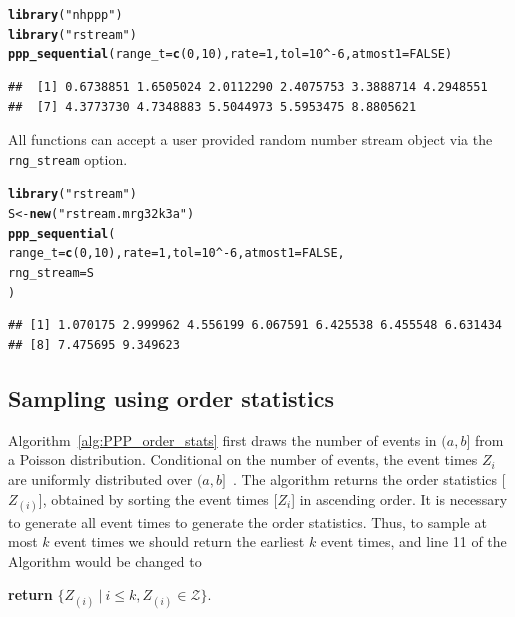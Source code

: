 \documentclass[article,nojss]{jss}\usepackage[]{graphicx}\usepackage[]{xcolor}
\makeatletter
\newcommand{\hlnum}[1]{\textcolor[rgb]{0.686,0.059,0.569}{#1}}%
\newcommand{\hlstr}[1]{\textcolor[rgb]{0.192,0.494,0.8}{#1}}%
\newcommand{\hlopt}[1]{\textcolor[rgb]{0,0,0}{#1}}%
\newcommand{\hlstd}[1]{\textcolor[rgb]{0.345,0.345,0.345}{#1}}%
\newcommand{\hlkwb}[1]{\textcolor[rgb]{0.69,0.353,0.396}{#1}}%
\newcommand{\hlkwc}[1]{\textcolor[rgb]{0.333,0.667,0.333}{#1}}%
\newcommand{\hlkwd}[1]{\textcolor[rgb]{0.737,0.353,0.396}{\textbf{#1}}}%
\newenvironment{kframe}{%
 \def\at@end@of@kframe{}%
 \ifinner\ifhmode%
  \def\at@end@of@kframe{\end{minipage}}%
  \begin{minipage}{\columnwidth}%
 \fi\fi%
 \def\FrameCommand##1{\hskip\@totalleftmargin \hskip-\fboxsep
 \colorbox{shadecolor}{##1}\hskip-\fboxsep
     \hskip-\linewidth \hskip-\@totalleftmargin \hskip\columnwidth}%
 \MakeFramed {\advance\hsize-\width
   \@totalleftmargin\z@ \linewidth\hsize
   \@setminipage}}%
 {\par\unskip\endMakeFramed%
 \at@end@of@kframe}
\newenvironment{knitrout}{}{} %
\makeatother
\begin{document}
\begin{knitrout}
\color{fgcolor}\begin{kframe}
\begin{alltt}
\hlkwd{library}\hlstd{(}\hlstr{"nhppp"}\hlstd{)}
\hlkwd{library}\hlstd{(}\hlstr{"rstream"}\hlstd{)}
\hlkwd{ppp_sequential}\hlstd{(}\hlkwc{range_t} \hlstd{=} \hlkwd{c}\hlstd{(}\hlnum{0}\hlstd{,} \hlnum{10}\hlstd{),} \hlkwc{rate} \hlstd{=} \hlnum{1}\hlstd{,} \hlkwc{tol} \hlstd{=} \hlnum{10}\hlopt{^-}\hlnum{6}\hlstd{,} \hlkwc{atmost1} \hlstd{=} \hlnum{FALSE}\hlstd{)}
\end{alltt}
\begin{verbatim}
##  [1] 0.6738851 1.6505024 2.0112290 2.4075753 3.3888714 4.2948551
##  [7] 4.3773730 4.7348883 5.5044973 5.5953475 8.8805621
\end{verbatim}
\end{kframe}
\end{knitrout}

All  functions can accept a user provided random number stream object via the \texttt{rng\_stream} option.

\begin{knitrout}
\color{fgcolor}\begin{kframe}
\begin{alltt}
\hlkwd{library}\hlstd{(}\hlstr{"rstream"}\hlstd{)}
\hlstd{S} \hlkwb{<-} \hlkwd{new}\hlstd{(}\hlstr{"rstream.mrg32k3a"}\hlstd{)}
\hlkwd{ppp_sequential}\hlstd{(}
  \hlkwc{range_t} \hlstd{=} \hlkwd{c}\hlstd{(}\hlnum{0}\hlstd{,} \hlnum{10}\hlstd{),} \hlkwc{rate} \hlstd{=} \hlnum{1}\hlstd{,} \hlkwc{tol} \hlstd{=} \hlnum{10}\hlopt{^-}\hlnum{6}\hlstd{,} \hlkwc{atmost1} \hlstd{=} \hlnum{FALSE}\hlstd{,}
  \hlkwc{rng_stream} \hlstd{= S}
\hlstd{)}
\end{alltt}
\begin{verbatim}
## [1] 1.070175 2.999962 4.556199 6.067591 6.425538 6.455548 6.631434
## [8] 7.475695 9.349623
\end{verbatim}
\end{kframe}
\end{knitrout}


\subsection{Sampling using order statistics}\label{sec:PPP_order_stats}


Algorithm~\ref{alg:PPP_order_stats} first draws the number of events in $(a, b]$ from a Poisson distribution. Conditional on the number of events, the event times $Z_i$ are uniformly distributed over $(a, b]$~\citep[par. 4.1]{cox1965theory}. The algorithm returns the order statistics [$Z_{(i)}$], obtained by sorting the event times [$Z_i$] in ascending order. It is necessary to generate all event times to generate the order statistics. Thus, to sample at most $k$ event times we should return the earliest $k$ event times, and line 11 of the Algorithm would be changed to
\begin{center}
\textbf{return} {$\{Z_{(i)} \ | \ i \le k, Z_{(i)} \in \mathcal{Z}\}$}.
\end{center}
\end{document}
